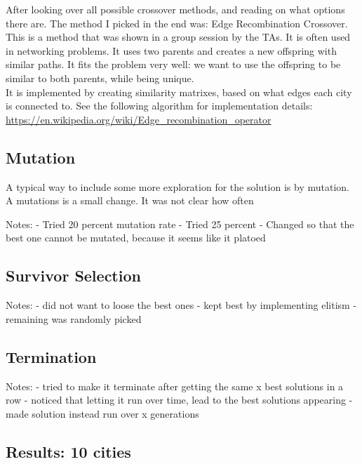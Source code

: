 \documentclass{article}
\begin{document}
    After looking over all possible crossover methods, and reading on what options there are. The method I picked in the end was: Edge Recombination Crossover. 
    This is a method that was shown in a group session by the TAs. It is often used in networking problems. It uses two parents and creates a new offspring with similar paths. 
    It fits the problem very well: we want to use the offspring to be similar to both parents, while being unique. \\

    It is implemented by creating similarity matrixes, based on what edges each city is connected to. 
    See the following algorithm for implementation details: \url{https://en.wikipedia.org/wiki/Edge_recombination_operator}
    

    \subsection{Mutation}

    A typical way to include some more exploration for the solution is by mutation. A mutations is a small change. 
    It was not clear how often 

    Notes:
    - Tried 20 percent mutation rate 
    - Tried 25 percent 
    - Changed so that the best one cannot be mutated, because it seems like it platoed 

    \subsection{Survivor Selection}

    Notes:
    - did not want to loose the best ones
    - kept best by implementing elitism
    - remaining was randomly picked  

    \subsection{Termination}

    Notes: 
    - tried to make it terminate after getting the same x best solutions in a row
    - noticed that letting it run over time, lead to the best solutions appearing 
    - made solution instead run over x generations 

    \newpage

    \subsection{Results: 10 cities}
\end{document}
